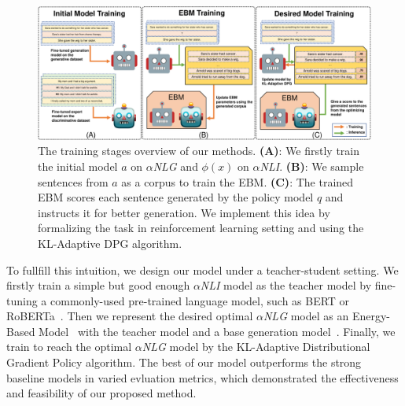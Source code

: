 


\begin{figure}[ht]
    \centering
    \includegraphics[width=1.0\textwidth]{figs/overview_graph.pdf}
    \caption{The training stages overview of our methods. 
    \textbf{(A)}: We firstly train the initial model $a$ on $\alpha$\textit{NLG} and $\phi(x)$ on $\alpha$\textit{NLI}.
    \textbf{(B)}: We sample sentences from $a$ as a corpus to train the EBM.
    \textbf{(C)}: The trained EBM scores each sentence generated by the policy model $q$ and instructs it
    for better generation. We implement this idea by formalizing the task in reinforcement learning setting
    and using the KL-Adaptive DPG algorithm.
    }
    \label{fig:overview}
\end{figure}


To fullfill this intuition, we design our model under a teacher-student setting.
We firstly train a simple but good enough $\alpha$\textit{NLI} model as the teacher model
by fine-tuning a commonly-used pre-trained language model, such as BERT or RoBERTa~\citep{bert, roberta}.
Then we represent the desired optimal $\alpha$\textit{NLG} model as an Energy-Based Model~\citep{hintonebm,LeCun06atutorial,DBLP:conf/iclr/DengBOSR20}
with the teacher model and a base generation model~\citep{gpt2, bart}. %
Finally, we train to reach the optimal $\alpha$\textit{NLG} model by the KL-Adaptive Distributional Gradient Policy algorithm.
The best of our model outperforms the strong baseline models in varied evluation metrics, which
demonstrated the effectiveness and feasibility of our proposed method.

